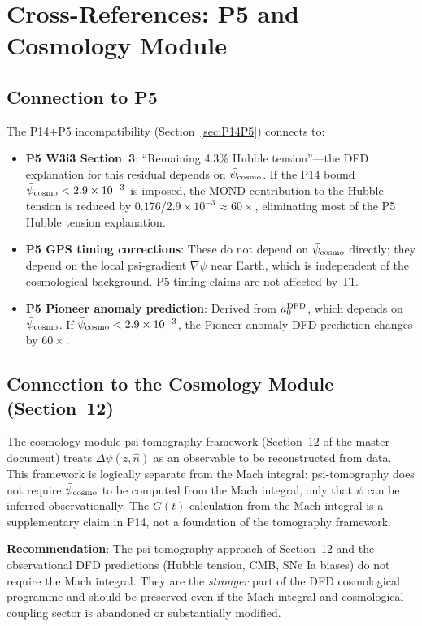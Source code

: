 \documentclass[11pt]{article}
\newcommand{\ee}[1]{\times 10^{#1}}
\newcommand{\psicosmo}{\bar{\psi}_{\rm cosmo}}
\begin{document}
\section{Cross-References: P5 and Cosmology Module}
\label{sec:cross-refs}

\subsection{Connection to P5}

The P14+P5 incompatibility (Section~\ref{sec:P14P5}) connects to:
\begin{itemize}
\item \textbf{P5 W3i3 Section~3}: ``Remaining 4.3\% Hubble tension''---the
  DFD explanation for this residual depends on $\psicosmo$. If the P14 bound
  $\psicosmo < 2.9\ee{-3}$ is imposed, the MOND contribution to the Hubble
  tension is reduced by $0.176/2.9\ee{-3} \approx 60\times$, eliminating
  most of the P5 Hubble tension explanation.
\item \textbf{P5 GPS timing corrections}: These do not depend on $\psicosmo$
  directly; they depend on the local psi-gradient $\nabla\psi$ near Earth,
  which is independent of the cosmological background. P5 timing claims
  are not affected by T1.
\item \textbf{P5 Pioneer anomaly prediction}: Derived from $a_0^{\rm DFD}$,
  which depends on $\psicosmo$. If $\psicosmo < 2.9\ee{-3}$, the Pioneer
  anomaly DFD prediction changes by $60\times$.
\end{itemize}

\subsection{Connection to the Cosmology Module (Section~12)}

The cosmology module psi-tomography framework (Section~12 of the master
document) treats $\Delta\psi(z,\hat{n})$ as an observable to be reconstructed
from data. This framework is logically separate from the Mach integral:
psi-tomography does not require $\psicosmo$ to be computed from the Mach
integral, only that $\psi$ can be inferred observationally. The $G(t)$
calculation from the Mach integral is a supplementary claim in P14, not
a foundation of the tomography framework.

\textbf{Recommendation}: The psi-tomography approach of Section~12 and
the observational DFD predictions (Hubble tension, CMB, SNe Ia biases) do
not require the Mach integral. They are the \emph{stronger} part of the DFD
cosmological programme and should be preserved even if the Mach integral
and cosmological coupling sector is abandoned or substantially modified.
\end{document}
